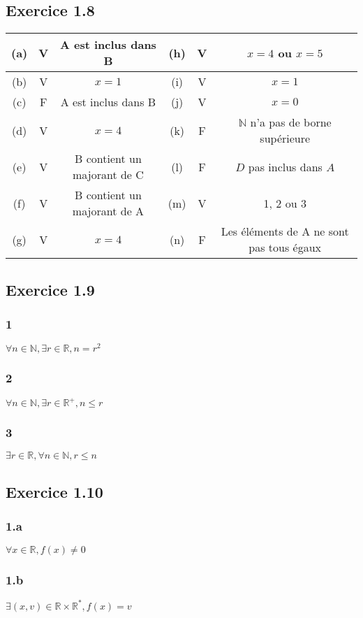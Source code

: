 \documentclass[a4paper,10pt]{report}
\begin{document}
\subsection*{Exercice 1.8}
\begin{tabular}{|c|c|c|c|c|c|}
	\hline
	(a) & V & A est inclus dans B & (h) & V & $x=4$ ou $x=5$\\
	\hline
	(b) & V & $x=1$ & (i) & V & $x=1$\\
	\hline
	(c) & F & A est inclus dans B & (j) & V & $x=0$ \\
	\hline
	(d) & V & $x=4$ & (k) & F & $\mathbb{N}$ n'a pas de borne supérieure \\
	\hline
	(e) & V & B contient un majorant de C & (l) & F & $D$ pas inclus dans $A$ \\
	\hline
	(f) & V & B contient un majorant de A & (m) & V & 1, 2 ou 3 \\
	\hline
	(g) & V & $x=4$ & (n) & F & Les éléments de A ne sont pas tous égaux \\
	\hline
\end{tabular}


\subsection*{Exercice 1.9}
\subsubsection*{1}
$\forall n \in \mathbb{N}, \exists r \in \mathbb{R}, n = r^2$
\subsubsection*{2}
$\forall n \in \mathbb{N}, \exists r \in \mathbb{R}^{+}, n \leq r$
\subsubsection*{3}
$\exists r \in \mathbb{R}, \forall n \in \mathbb{N}, r \leq n $


\subsection*{Exercice 1.10}
\subsubsection*{1.a}
$\forall x \in \mathbb{R}, f(x)\neq0$
\subsubsection*{1.b}
$\exists (x,v) \in \mathbb{R} \times \mathbb{R}^{*}, f(x) =v$
\end{document}
